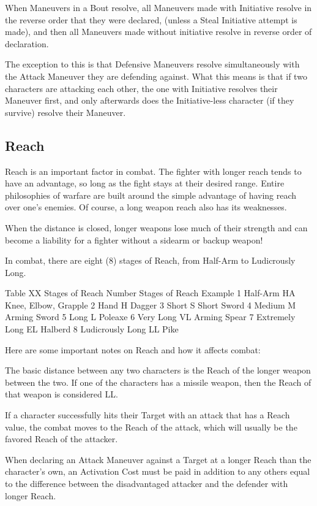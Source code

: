 \documentclass[oneside,11pt,english]{book}
\begin{document}
When Maneuvers in a Bout resolve, all Maneuvers made with Initiative resolve in the reverse
order that they were declared, (unless a Steal Initiative attempt is made), and then all Maneuvers
made without initiative resolve in reverse order of declaration.

The exception to this is that Defensive Maneuvers resolve simultaneously with the Attack
Maneuver they are defending against. What this means is that if two characters are attacking each
other, the one with Initiative resolves their Maneuver first, and only afterwards does the
Initiative-less character (if they survive) resolve their Maneuver.

\subsection{Reach}\label{sec:Reach}
Reach is an important factor in combat. The fighter with longer reach tends to have an advantage, so long as the fight stays at their desired range. Entire philosophies of warfare are built around the simple advantage of having reach over one’s enemies. Of course, a long weapon reach also has its weaknesses.

When the distance is closed, longer weapons lose much of their strength and can become a liability for a fighter without a sidearm or backup weapon!

In combat, there are eight (8) stages of Reach, from Half-Arm to Ludicrously Long.

Table XX Stages of Reach %
Number
Stages of Reach
Example
1
Half-Arm
HA
Knee, Elbow, Grapple
2
Hand
H
Dagger
3
Short
S
Short Sword
4
Medium
M
Arming Sword
5
Long
L
Poleaxe
6
Very Long
VL
Arming Spear
7
Extremely Long
EL
Halberd
8
Ludicrously Long
LL
Pike

Here are some important notes on Reach and how it affects combat:

The basic distance between any two characters is the Reach of the longer weapon between the two. If one of the characters has a missile weapon, then the Reach of that weapon is considered LL.

If a character successfully hits their Target with an attack that has a Reach value, the combat moves to the Reach of the attack, which will usually be the favored Reach of the attacker.

When declaring an Attack Maneuver against a Target at a longer Reach than the character’s own, an Activation Cost must be paid in addition to any others equal to the difference between the disadvantaged attacker and the defender with longer Reach.
\end{document}
